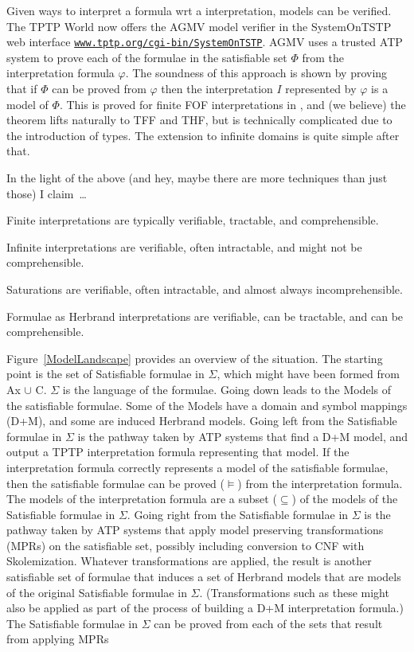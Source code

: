 \documentclass{easychair}
\newenvironment{packed_itemize}{
\vspace*{-0.2em}
\begin{itemize}
\setlength{\partopsep}{0pt}
\setlength{\itemsep}{1pt}
\setlength{\parskip}{0pt}
\setlength{\parsep}{0pt}
}{\end{itemize}}
\begin{document}
Given ways to interpret a formula wrt a interpretation, models can be verified.
The TPTP World now offers the AGMV model verifier in the SystemOnTSTP \cite{Sut07-CSR} web 
interface \href{https://www.tptp.org/cgi-bin/SystemOnTSTP}{{\tt www.tptp.org/cgi-bin/SystemOnTSTP}}.
AGMV uses a trusted ATP system to prove each of the formulae in the satisfiable set $\Phi$
from the interpretation formula $\varphi$.
The soundness of this approach is shown by proving that if $\Phi$ can be proved from $\varphi$ 
then the interpretation $I$ represented by $\varphi$ is a model of $\Phi$.
This is proved for finite FOF interpretations in \cite{SS+23-LPAR}, and (we believe) the theorem 
lifts naturally to TFF and THF, but is technically complicated due to the introduction of types.
The extension to infinite domains is quite simple after that.

In the light of the above (and hey, maybe there are more techniques than just those) I claim~\ldots
\begin{packed_itemize}
\item Finite interpretations are typically verifiable, tractable, and comprehensible.
\item Infinite interpretations are verifiable, often intractable, and might not be 
      comprehensible.
\item Saturations are verifiable, often intractable, and almost always incomprehensible.
\item Formulae as Herbrand interpretations are verifiable, can be tractable, and can be
      comprehensible.
\end{packed_itemize}

Figure~\ref{ModelLandscape} provides an overview of the situation.
The starting point is the set of {\sf Satisfiable formulae in $\Sigma$}, which might have been
formed from {\sf Ax $\cup$ {\raisebox{0.4ex}{\texttildelow}}C}. 
$\Sigma$ is the language of the formulae.
Going down leads to the {\sf Models} of the satisfiable formulae.
Some of the {\sf Models} have a domain and symbol mappings ({\sf D+M}), and some are induced 
Herbrand models.
Going left from the {\sf Satisfiable formulae in $\Sigma$} is the pathway taken by ATP systems 
that find a {\sf D+M} model, and output a TPTP interpretation formula representing that model.
If the interpretation formula correctly represents a model of the satisfiable formulae, then
the satisfiable formulae can be proved ($\vDash$) from the interpretation formula.
The models of the interpretation formula are a subset ($\subseteq$) of the models of the
{\sf Satisfiable formulae in $\Sigma$}.
Going right from the {\sf Satisfiable formulae in $\Sigma$} is the pathway taken by ATP systems
that apply model preserving transformations ({\sf MPR}s) on the satisfiable set, possibly 
including conversion to CNF with Skolemization.
Whatever transformations are applied, the result is another satisfiable set of formulae that 
induces a set of Herbrand models that are models of the original {\sf Satisfiable formulae in 
$\Sigma$}.
(Transformations such as these might also be applied as part of the process of building a {\sf D+M}
interpretation formula.)
The {\sf Satisfiable formulae in $\Sigma$} can be proved from each of the sets that result from 
applying MPRs
\end{document}
